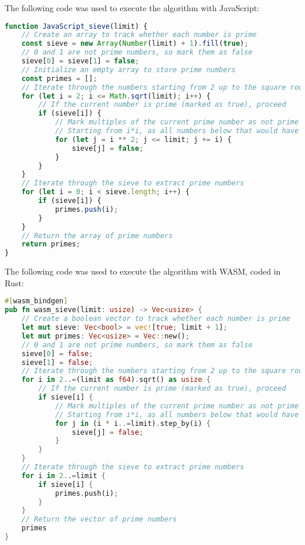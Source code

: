 The following code was used to execute the algorithm with JavaScript:
\begin{lstlisting}[language=JavaScript, caption={Sieve of Eratosthenes in JavaScript, source: self-coded}]
function JavaScript_sieve(limit) {
    // Create an array to track whether each number is prime
    const sieve = new Array(Number(limit) + 1).fill(true);
    // 0 and 1 are not prime numbers, so mark them as false
    sieve[0] = sieve[1] = false;
    // Initialize an empty array to store prime numbers
    const primes = [];
    // Iterate through the numbers starting from 2 up to the square root of the limit
    for (let i = 2; i <= Math.sqrt(limit); i++) {
        // If the current number is prime (marked as true), proceed
        if (sieve[i]) {
            // Mark multiples of the current prime number as not prime
            // Starting from i*i, as all numbers below that would have been already marked
            for (let j = i ** 2; j <= limit; j += i) {
                sieve[j] = false;
            }
        }
    }
    // Iterate through the sieve to extract prime numbers
    for (let i = 0; i < sieve.length; i++) {
        if (sieve[i]) {
            primes.push(i);
        }
    }
    // Return the array of prime numbers
    return primes;
}
\end{lstlisting}
\newpage
The following code was used to execute the algorithm with WASM, coded in Rust:
\begin{lstlisting}[language=Rust, caption={Sieve of Eratosthenes in Rust, source: self-coded}]
#[wasm_bindgen]
pub fn wasm_sieve(limit: usize) -> Vec<usize> {
    // Create a boolean vector to track whether each number is prime
    let mut sieve: Vec<bool> = vec![true; limit + 1];
    let mut primes: Vec<usize> = Vec::new();
    // 0 and 1 are not prime numbers, so mark them as false
    sieve[0] = false;
    sieve[1] = false;
    // Iterate through the numbers starting from 2 up to the square root of the limit
    for i in 2..=(limit as f64).sqrt() as usize {
        // If the current number is prime (marked as true), proceed
        if sieve[i] {
            // Mark multiples of the current prime number as not prime
            // Starting from i*i, as all numbers below that would have been already marked
            for j in (i * i..=limit).step_by(i) {
                sieve[j] = false;
            }
        }
    }
    // Iterate through the sieve to extract prime numbers
    for i in 2..=limit {
        if sieve[i] {
            primes.push(i);
        }
    }
    // Return the vector of prime numbers
    primes
}
\end{lstlisting}

